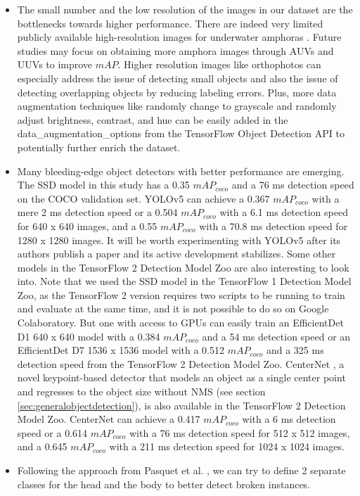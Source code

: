 \documentclass[a4paper, 11pt, oneside]{article}
\begin{document}
\begin{itemize}
  \item The small number and the low resolution of the images in our dataset are the bottlenecks towards higher
  performance. There are indeed very limited publicly available high-resolution images for underwater amphoras
  \cite{pasquet2017amphora}. Future studies may focus on obtaining more amphora images through AUVs and UUVs to improve
  $mAP$. Higher resolution images like orthophotos can especially address the issue of detecting
  small objects \cite{kisantal2019augmentation} and also the issue of detecting overlapping objects by reducing labeling
  errors. Plus, more data augmentation techniques like randomly change to grayscale and randomly adjust brightness,
  contrast, and hue can be easily added in the data\_augmentation\_options from the TensorFlow Object Detection API
  to potentially further enrich the dataset.
  \item Many bleeding-edge object detectors with better performance are emerging. The SSD model in this study
  has a 0.35 $mAP_{coco}$ and a 76 ms detection speed on the COCO validation set. YOLOv5 can achieve a 0.367
  $mAP_{coco}$ with a mere 2 ms detection speed or a 0.504 $mAP_{coco}$ with a 6.1 ms detection speed for 640 x 640 images,
  and a 0.55 $mAP_{coco}$ with a 70.8 ms detection speed for 1280 x 1280 images. It will be worth experimenting with
  YOLOv5 after its authors publish a paper and its active development stabilizes. Some other models in the TensorFlow 2
  Detection Model Zoo \cite{tf2detectionmodelzoo} are also interesting to look into. Note that we used the SSD
  model in the TensorFlow 1 Detection Model Zoo, as the TensorFlow 2 version requires two scripts to be running
  to train and evaluate at the same time, and it is not possible to do so on Google Colaboratory. But one with access to
  GPUs can easily train an EfficientDet \cite{tan2020efficientdet} D1 640 x 640 model with a 0.384 $mAP_{coco}$ and a
  54 ms detection speed or an EfficientDet D7 1536 x 1536 model with a 0.512 $mAP_{coco}$ and a 325 ms detection speed
  from the TensorFlow 2 Detection Model Zoo. CenterNet \cite{zhou2019objects}, a novel keypoint-based detector that
  models an object as a single center point and regresses to the object size without NMS
  (see section \ref{sec:generalobjectdetection}), is also available in the TensorFlow 2 Detection Model Zoo. CenterNet
  can achieve a 0.417 $mAP_{coco}$ with a 6 ms detection speed or a 0.614 $mAP_{coco}$ with a 76 ms detection
  speed for 512 x 512 images, and a 0.645 $mAP_{coco}$ with a 211 ms detection speed for 1024 x 1024 images.
  \item Following the approach from Pasquet et al. \cite{pasquet2017amphora}, we can try to define 2 separate classes
  for the head and the body to better detect broken instances.
\end{itemize}

\newpage

\printbibliography
\end{document}
